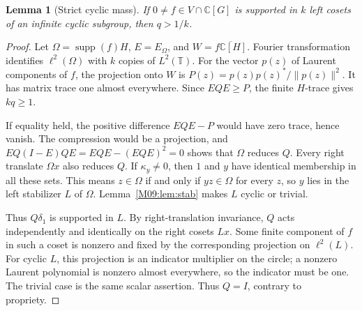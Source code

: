 \documentclass[11pt,a4paper,oneside]{report}
\newtheorem{lemma}[theorem]{Lemma}
\theoremstyle{definition}
\theoremstyle{remark}
\DeclareMathOperator{\supp}{supp}
\newcommand{\C}{\mathbb C}
\begin{document}
\begin{lemma}[Strict cyclic mass]\label{M09:lem:strict}
If $0\ne f\in V\cap\C[G]$ is supported in $k$ left cosets of
an infinite cyclic subgroup, then $q>1/k$.
\end{lemma}
\begin{proof}
Let $\Omega=\supp(f)H$, $E=E_\Omega$, and
$W=\overline{f\C[H]}$. Fourier transformation identifies
$\ell^2(\Omega)$ with $k$ copies of $L^2(\mathbb T)$.
For the vector $p(z)$ of Laurent components of $f$, the projection
onto $W$ is $P(z)=p(z)p(z)^*/\|p(z)\|^2$. It has matrix trace one
almost everywhere. Since $EQE\ge P$, the finite $H$-trace gives
$kq\ge1$.

If equality held, the positive difference $EQE-P$ would have
zero trace, hence vanish. The compression would be a projection,
and $EQ(I-E)QE=EQE-(EQE)^2=0$ shows that $\Omega$ reduces $Q$.
Every right translate $\Omega x$ also reduces $Q$. If $\kappa_y\ne0$,
then $1$ and $y$ have identical membership in all these sets. This
means $z\in\Omega$ if and only if $yz\in\Omega$ for every $z$,
so $y$ lies in the left stabilizer $L$ of $\Omega$.
Lemma~\ref{M09:lem:stab} makes $L$ cyclic or trivial.

Thus $Q\delta_1$ is supported in $L$. By right-translation
invariance, $Q$ acts independently and identically on the right
cosets $Lx$. Some finite component of $f$ in such a coset is
nonzero and fixed by the corresponding projection on $\ell^2(L)$.
For cyclic $L$, this projection is an indicator multiplier on
the circle; a nonzero Laurent polynomial is nonzero almost
everywhere, so the indicator must be one. The trivial case is
the same scalar assertion. Thus $Q=I$, contrary to propriety.
\end{proof}
\end{document}
